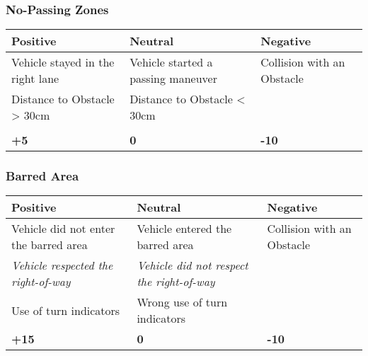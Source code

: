 {	

	\subsubsection*{No-Passing Zones}
	\begin{table}[H]
		\begin{tabularx}{\textwidth}{XXX}
			\toprule
			\textbf{Positive}                & \textbf{Neutral}                   & \textbf{Negative}          \\
			\midrule
			Vehicle stayed in the right lane & Vehicle started a passing maneuver & Collision with an Obstacle \\
			Distance to Obstacle > 30cm      & Distance to Obstacle < 30cm        &                            \\
			                                 &                                    &                            \\
			\topstrut
			\textbf{+5}                      & \textbf{0}                         & \textbf{-10}               \\
			\bottomrule
		\end{tabularx}
	\end{table}

	\clearpage

	\subsubsection*{Barred Area}
	\begin{table}[H]
		\begin{tabularx}{\textwidth}{XXX}
			\toprule
			\textbf{Positive}                                           & \textbf{Neutral}                                                  & \textbf{Negative}          \\
			\midrule
			Vehicle did not enter the barred area                       & Vehicle entered the barred area                                   & Collision with an Obstacle \\
			\textit{Vehicle respected the right-of-way}\footnotemark[1] & \textit{Vehicle did not respect the right-of-way}\footnotemark[1] &                            \\
			Use of turn indicators                                      & Wrong use of turn indicators                                      &                            \\
			\topstrut
			\textbf{+15}                                                & \textbf{0}                                                        & \textbf{-10}               \\
			\bottomrule
		\end{tabularx}
	\end{table}

}
